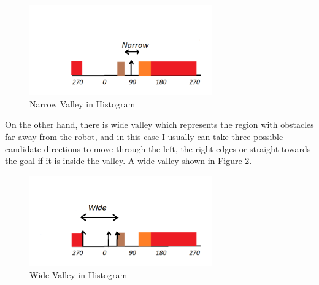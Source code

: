 \begin{figure}[H]
  \centering
  \includegraphics[width= 0.7\textwidth]{Figures/narrow.PNG}
  \caption[Narrow Valley in Histogram]{Narrow Valley in Histogram}
   \label{fig:Narrow Valley in Histogram} 
\end{figure}


\noindent On the other hand, there is wide valley which represents the region with obstacles far away from the robot, and in this case I usually can take three possible candidate directions to move through the left, the right edges or straight towards the goal if it is inside the valley. A wide valley shown in Figure \ref{fig:Wide Valley in Histogram}. 
\begin{figure}[H]
  \centering
  \includegraphics[width= 0.7\textwidth]{Figures/wide.PNG}
  \caption[Wide Valley in Histogram]{Wide Valley in Histogram}
   \label{fig:Wide Valley in Histogram} 
\end{figure}


